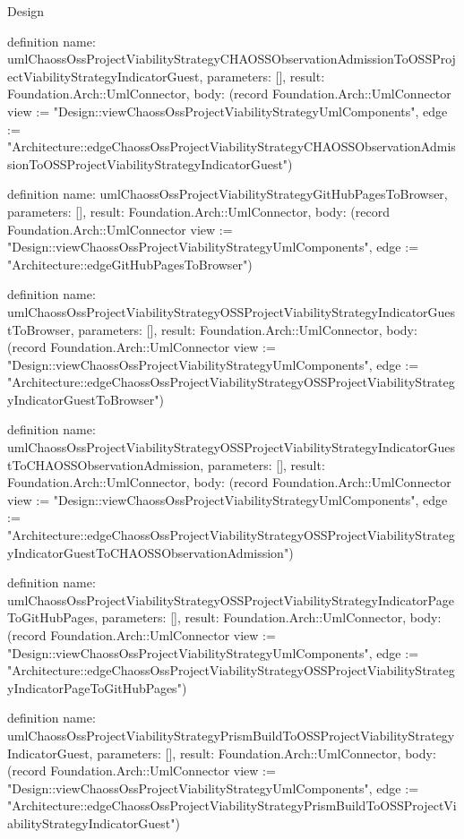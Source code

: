 \begin{lexlean}{Design}
\begin{semanticmodule}
definition{
  name: umlChaossOssProjectViabilityStrategyCHAOSSObservationAdmissionToOSSProjectViabilityStrategyIndicatorGuest,
  parameters: [],
  result: Foundation.Arch::UmlConnector,
  body: (record Foundation.Arch::UmlConnector {view := "Design::viewChaossOssProjectViabilityStrategyUmlComponents", edge := "Architecture::edgeChaossOssProjectViabilityStrategyCHAOSSObservationAdmissionToOSSProjectViabilityStrategyIndicatorGuest"})
}

definition{
  name: umlChaossOssProjectViabilityStrategyGitHubPagesToBrowser,
  parameters: [],
  result: Foundation.Arch::UmlConnector,
  body: (record Foundation.Arch::UmlConnector {view := "Design::viewChaossOssProjectViabilityStrategyUmlComponents", edge := "Architecture::edgeGitHubPagesToBrowser"})
}

definition{
  name: umlChaossOssProjectViabilityStrategyOSSProjectViabilityStrategyIndicatorGuestToBrowser,
  parameters: [],
  result: Foundation.Arch::UmlConnector,
  body: (record Foundation.Arch::UmlConnector {view := "Design::viewChaossOssProjectViabilityStrategyUmlComponents", edge := "Architecture::edgeChaossOssProjectViabilityStrategyOSSProjectViabilityStrategyIndicatorGuestToBrowser"})
}

definition{
  name: umlChaossOssProjectViabilityStrategyOSSProjectViabilityStrategyIndicatorGuestToCHAOSSObservationAdmission,
  parameters: [],
  result: Foundation.Arch::UmlConnector,
  body: (record Foundation.Arch::UmlConnector {view := "Design::viewChaossOssProjectViabilityStrategyUmlComponents", edge := "Architecture::edgeChaossOssProjectViabilityStrategyOSSProjectViabilityStrategyIndicatorGuestToCHAOSSObservationAdmission"})
}

definition{
  name: umlChaossOssProjectViabilityStrategyOSSProjectViabilityStrategyIndicatorPageToGitHubPages,
  parameters: [],
  result: Foundation.Arch::UmlConnector,
  body: (record Foundation.Arch::UmlConnector {view := "Design::viewChaossOssProjectViabilityStrategyUmlComponents", edge := "Architecture::edgeChaossOssProjectViabilityStrategyOSSProjectViabilityStrategyIndicatorPageToGitHubPages"})
}

definition{
  name: umlChaossOssProjectViabilityStrategyPrismBuildToOSSProjectViabilityStrategyIndicatorGuest,
  parameters: [],
  result: Foundation.Arch::UmlConnector,
  body: (record Foundation.Arch::UmlConnector {view := "Design::viewChaossOssProjectViabilityStrategyUmlComponents", edge := "Architecture::edgeChaossOssProjectViabilityStrategyPrismBuildToOSSProjectViabilityStrategyIndicatorGuest"})
}


\end{semanticmodule}
\end{lexlean}
